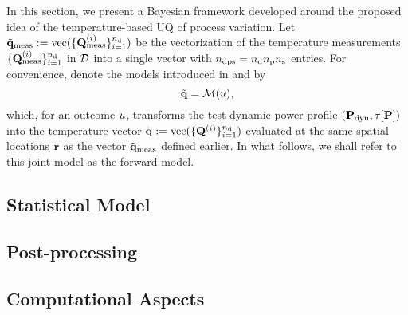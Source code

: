 In this section, we present a Bayesian framework developed around the proposed idea of the temperature-based UQ of process variation. Let $\tilde{\mathbf{q}}_{\text{meas}} := \text{vec}(\{\mathbf{Q}^{(i)}_{\text{meas}}\}_{i = 1}^{n_{\text{d}}})$ be the vectorization of the temperature measurements $\{ \mathbf{Q}^{(i)}_{\text{meas}} \}_{i = 1}^{n_{\text{d}}}$ in $\mathcal{D}$ into a single vector with ${n_\text{dps}} = {n_{\text{d}}} {n_\text{p}} {n_\text{s}}$ entries. For convenience, denote the models introduced in  and  by
\begin{equation} \elabel{model}
  \mvT = \model{\u},
\end{equation}
which, for an outcome $u$, transforms the test dynamic power profile $(\mathbf{P}_{\text{dyn}}, \tau[\mathbf{P}])$ into the temperature vector $\tilde{\mathbf{q}} := \text{vec}(\{\mathbf{Q}^{(i)}\}_{i = 1}^{n_{\text{d}}})$ evaluated at the same spatial locations $\mathbf{r}$ as the vector $\tilde{\mathbf{q}}_{\text{meas}}$ defined earlier. In what follows, we shall refer to this joint model as the forward model.

\subsection{Statistical Model} 


\subsection{Post-processing} 


\subsection{Computational Aspects} 


